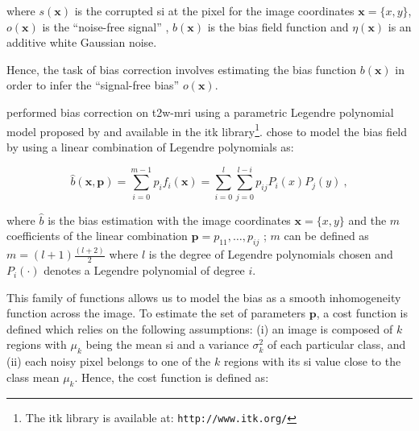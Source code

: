 \begin{enumerate}[leftmargin=*]
\noindent where $s(\mathbf{x})$ is the corrupted \ac{si} at the pixel for the image coordinates $\mathbf{x} = \{x,y\}$, $o(\mathbf{x})$ is the ``noise-free signal'' , $b(\mathbf{x})$ is the bias field function and $\eta(\mathbf{x})$ is an additive white Gaussian noise.
%
%
%

Hence, the task of bias correction involves estimating the bias function $b(\mathbf{x})$ in order to infer the ``signal-free bias'' $o(\mathbf{x})$.%

\cite{Viswanath2009} performed bias correction on \ac{t2w}-\ac{mri} using a parametric Legendre polynomial model proposed by \cite{Styner2000} and available in the \ac{itk} library\footnote{The \ac{itk} library is available at: \texttt{http://www.itk.org/}}. \cite{Styner2000} chose to model the bias field by using a linear combination of Legendre polynomials as:

\begin{equation}
	\hat{b}(\mathbf{x},\mathbf{p}) = \sum_{i=0}^{m-1} p_i f_i(\mathbf{x}) =  \sum_{i=0}^{l} \sum_{j=0}^{l-i} p_{ij} P_i(x) P_j(y) \ ,
	\label{eq:biascorr}
\end{equation}

\noindent where $\hat{b}$ is the bias estimation with the image coordinates $\mathbf{x} = \{x,y\}$ and the $m$ coefficients of the linear combination $\mathbf{p} = {p_{11},\dotsc,p_{ij}}$ ; $m$ can be defined as $m=(l+1)\frac{(l+2)}{2}$ where $l$ is the degree of Legendre polynomials chosen and $P_i(\cdot)$ denotes a Legendre polynomial of degree $i$.

This family of functions allows us to model the bias as a smooth inhomogeneity function across the image. To estimate the set of parameters $\mathbf{p}$, a cost function is defined which relies on the following assumptions: (i) an image is composed of $k$ regions with $\mu_k$ being the mean \ac{si} and a variance $\sigma^{2}_{k}$ of each particular class, and (ii) each noisy pixel belongs to one of the $k$ regions with its \ac{si} value close to the class mean $\mu_k$. Hence, the cost function is defined as:


\end{enumerate}
